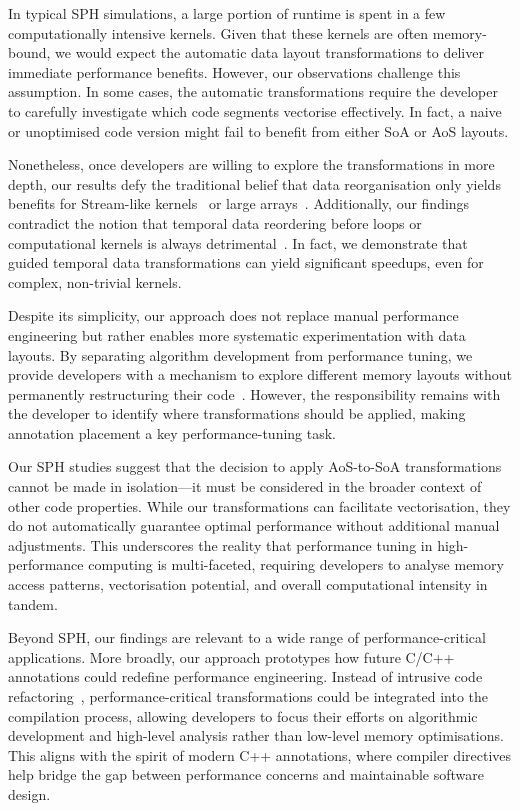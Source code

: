 In typical SPH simulations, a large portion of runtime is spent in a few computationally intensive kernels. Given that these kernels are often memory-bound, we would expect the automatic data layout transformations to deliver immediate performance benefits. However, our observations challenge this assumption. In some cases, the automatic transformations require the developer to carefully investigate which code segments vectorise effectively. In fact, a naive or unoptimised code version might fail to benefit from either SoA or AoS layouts.

Nonetheless, once developers are willing to explore the transformations in more depth, our results defy the traditional belief that data reorganisation only yields benefits for Stream-like kernels~\cite{McCalpin:1995:Stream} or large arrays~\cite{Strzodka:2011:AbstractionSoA}. Additionally, our findings contradict the notion that temporal data reordering before loops or computational kernels is always detrimental~\cite{Hundt:2006:StructureLayoutOptimisation,Intel:MemoryLayoutTransformations}. In fact, we demonstrate that guided temporal data transformations can yield significant speedups, even for complex, non-trivial kernels.

Despite its simplicity, our approach does not replace manual performance engineering but rather enables more systematic experimentation with data layouts. By separating algorithm development from performance tuning, we provide developers with a mechanism to explore different memory layouts without permanently restructuring their code~\cite{Gallard:2020:Roles}. However, the responsibility remains with the developer to identify where transformations should be applied, making annotation placement a key performance-tuning task.

Our SPH studies suggest that the decision to apply AoS-to-SoA transformations cannot be made in isolation—it must be considered in the broader context of other code properties. While our transformations can facilitate vectorisation, they do not automatically guarantee optimal performance without additional manual adjustments. This underscores the reality that performance tuning in high-performance computing is multi-faceted, requiring developers to analyse memory access patterns, vectorisation potential, and overall computational intensity in tandem.

Beyond SPH, our findings are relevant to a wide range of performance-critical applications. More broadly, our approach prototypes how future C/C++ annotations could redefine performance engineering. Instead of intrusive code refactoring~\cite{Fowler}, performance-critical transformations could be integrated into the compilation process, allowing developers to focus their efforts on algorithmic development and high-level analysis rather than low-level memory optimisations. This aligns with the spirit of modern C++ annotations, where compiler directives help bridge the gap between performance concerns and maintainable software design.


